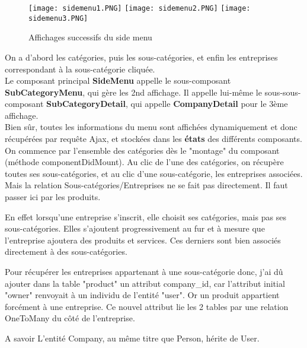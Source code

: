 \begin{figure}[H]
    \texttt{[image: sidemenu1.PNG]}
    \texttt{[image: sidemenu2.PNG]}
    \texttt{[image: sidemenu3.PNG]}
    \caption{Affichages successifs du side menu}
\end{figure}

On a d'abord les catégories, puis les sous-catégories, et enfin les entreprises correspondant à la sous-catégorie cliquée.
\\Le composant principal \textbf{SideMenu} appelle le sous-composant \textbf{SubCategoryMenu}, qui gère les 2nd affichage. 
Il appelle lui-même le sous-sous-composant \textbf{SubCategoryDetail}, qui appelle \textbf{CompanyDetail} pour le 3ème affichage.\\

Bien sûr, toutes les informations du menu sont affichées dynamiquement et donc récupérées par requête Ajax, et stockées dans les \textbf{états} des différents composants.\\
On commence par l'ensemble des catégories dès le "montage" du composant (méthode componentDidMount).
Au clic de l'une des catégories, on récupère toutes ses sous-catégories, et au clic d'une sous-catégorie, les entreprises associées.
Mais la relation Sous-catégories/Entreprises ne se fait pas directement. 
Il faut passer ici par les produits. 
\begin{myboxedtext}
En effet lorsqu'une entreprise s'inscrit, elle choisit ses catégories, mais pas ses sous-catégories. Elles s'ajoutent progressivement au fur et à mesure que l'entreprise ajoutera des produits et services.
Ces derniers sont bien associés directement à des sous-catégories.
\end{myboxedtext}

Pour récupérer les entreprises appartenant à une sous-catégorie donc, j'ai dû ajouter dans la table "product" un attribut company\_id, car l'attribut initial "owner" renvoyait à un individu de l'entité "user". 
Or un produit appartient forcément à une entreprise. 
Ce nouvel attribut lie les 2 tables par une relation OneToMany du côté de l'entreprise.

\begin{callout}{A savoir}
    L'entité Company, au même titre que Person, hérite de User.
\end{callout}


